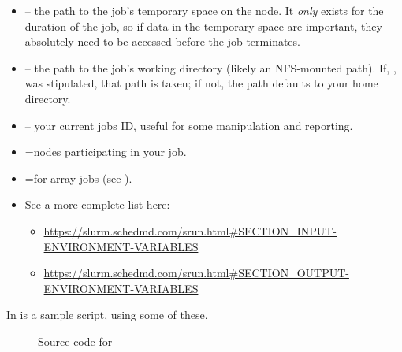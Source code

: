 \begin{itemize}
\item
 -- the path to the job's temporary space on the node. It
\emph{only} exists for the duration of the job, so if data in the temporary space 
are important, they absolutely need to be accessed before the job terminates.

\item
{} -- the path to the job's working directory (likely an
NFS-mounted path). If, , was stipulated, that path is taken; if not, 
the path defaults to your home directory.


\item
{} -- your current jobs ID, useful for some manipulation
and reporting.

\item
{}=nodes participating in your job.

\item
{}=for array jobs (see ).

\item
See a more complete list here:

\small
\begin{itemize}
\item
\url{https://slurm.schedmd.com/srun.html#SECTION_INPUT-ENVIRONMENT-VARIABLES}
\item
\url{https://slurm.schedmd.com/srun.html#SECTION_OUTPUT-ENVIRONMENT-VARIABLES}
\end{itemize}
\normalsize

\end{itemize}

\noindent
In  is a sample script, using some of these.

\begin{figure}[htpb]
    
    \caption{Source code for }
	\label{fig:tmpdir.sh}
\end{figure}
